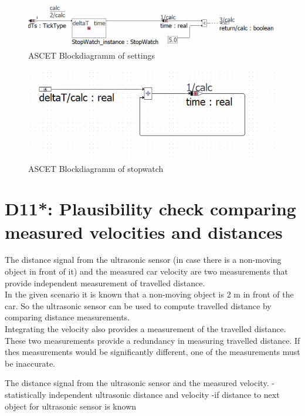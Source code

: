 \begin{figure}[H]
\centering
\includegraphics[width=1\textwidth]{images/Blockdiagramm_settings.png}
\caption{ASCET Blockdiagramm of settings}
\label{fig:BlockdiagrammSettings}
\end{figure}

\begin{figure}[H]
\centering
\includegraphics[width=1\textwidth]{images/Blockdiagramm_stopwatch.png}
\caption{ASCET Blockdiagramm of stopwatch}
\label{fig:BlockdiagrammStopwatch}
\end{figure}



\chapter{D11*: Plausibility check comparing measured velocities and distances}\label{cha:D11}
The distance signal from the ultrasonic sensor (in case there is a non-moving object in front of it) and the measured car velocity are two measurements that provide independent measurement of travelled distance.\\
In the given scenario it is known that a non-moving object is 2 m in front of the car. So the ultrasonic sensor can be used to compute travelled distance by comparing distance measurements.\\
Integrating the velocity also provides a measurement of the travelled distance. These two measurements provide a redundancy in measuring travelled distance. If thes measurements would be significantly different, one of the measurements must be inaccurate. 

The distance signal from the ultrasonic sensor and the measured velocity.
-statistically independent ultrasonic distance and velocity
-if distance to next object for ultrasonic sensor is known

